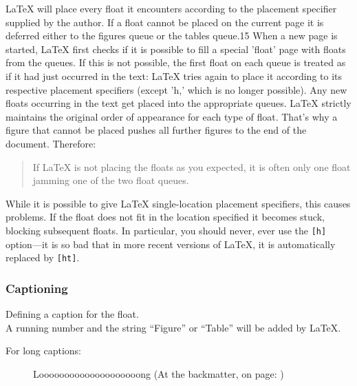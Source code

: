 \documentclass[a4paper]{article}
\begin{document}
\rule{0pt}{2ex}

\LaTeX{} will place every float it encounters according to the placement specifier supplied by the author.
If a float cannot be placed on the current page it is deferred either to the figures queue or the tables queue.15
When a new page is started, \LaTeX{} first checks if it is possible to fill a special 'float' page with floats from the queues.
If this is not possible, the first float on each queue is treated as if it had just occurred in the text:
\LaTeX{} tries again to place it according to its respective placement specifiers (except 'h,' which is no longer possible).
Any new floats occurring in the text get placed into the appropriate queues. \LaTeX{} strictly maintains the original order of appearance for each type of float.
That's why a figure that cannot be placed pushes all further figures to the end of the document. Therefore:

\begin{quote}
If \LaTeX{} is not placing the floats as you expected, it is often only one float jamming one of the two float queues.
\end{quote}

While it is possible to give \LaTeX{} single-location placement specifiers, this causes problems.
If the float does not fit in the location specified it becomes stuck,
blocking subsequent floats. In particular, you should never, ever use the \verb|[h]|
option—it is so bad that in more recent versions of \LaTeX{}, it is automatically replaced by \verb|[ht]|.

\newpage
\subsubsection{Captioning}

\rule{0pt}{2ex}


\rule{0pt}{2ex}

Defining a caption for the float.\\
A running number and the string ``Figure'' or ``Table'' will be added by \LaTeX{}.

\rule{0pt}{2ex}

For long captions:

\rule{0pt}{2ex}

\begin{figure}[!ht]
\caption[Short]{Loooooooooooooooooooong (At the backmatter, on page: \pageref{tab:lsoffigs})}
\end{figure}
\end{document}
